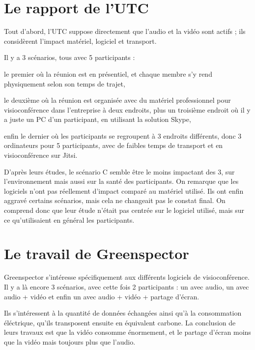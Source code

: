 \documentclass[11pt,a4paper]{report}
\begin{document}
\section{Le rapport de l'UTC}
Tout d'abord, l'UTC suppose directement que l'audio et la vidéo sont actifs ; ils considèrent l'impact matériel, logiciel et transport.

Il y a 3 scénarios, tous avec 5 participants : 
\bi \item le premier où la réunion est en présentiel, et chaque membre s'y rend physiquement selon son temps de trajet,
\item le deuxième où la réunion est organisée avec du matériel professionnel pour visioconférence dans l'entreprise à deux endroits, plus un troisième endroit où il y a juste un PC d'un participant, en utilisant la solution Skype,
\item enfin le dernier où les participants se regroupent à 3 endroits différents, donc 3 ordinateurs pour 5 participants, avec de faibles temps de transport et en visioconférence sur Jitsi. \ei

D'après leurs études, le scénario C semble être le moins impactant des 3, sur l'environnement mais aussi sur la santé des participants. On remarque que les logiciels n'ont pas réellement d'impact comparé au matériel utilisé. Ils ont enfin aggravé certains scénarios, mais cela ne changeait pas le constat final. On comprend donc que leur étude n'était pas centrée sur le logiciel utilisé, mais sur ce qu'utilisaient en général les participants.

\section{Le travail de Greenspector}
Greenspector s'intéresse spécifiquement aux différents logiciels de visioconférence. Il y a là encore 3 scénarios, avec cette fois 2 participants : un avec audio, un avec audio + vidéo et enfin un avec audio + vidéo + partage d'écran.

Ils s'intéressent à la quantité de données échangées ainsi qu'à la consommation éléctrique, qu'ils transposent ensuite en équivalent carbone. La conclusion de leurs travaux est que la vidéo consomme énormement, et le partage d'écran moins que la vidéo mais toujours plus que l'audio.
\end{document}
